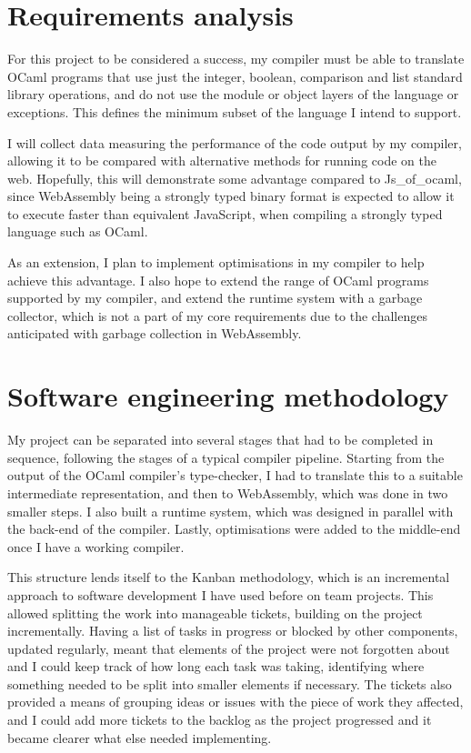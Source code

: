 \section{Requirements analysis}
For this project to be considered a success, my compiler must be able to translate OCaml programs that use just the integer, boolean, comparison and list standard library operations, and do not use the module or object layers of the language or exceptions. This defines the minimum subset of the language I intend to support. 

I will collect data measuring the performance of the code output by my compiler, allowing it to be compared with alternative methods for running code on the web.  Hopefully, this will demonstrate some advantage compared to Js\_of\_ocaml, since WebAssembly being a strongly typed binary format is expected to allow it to execute faster than equivalent JavaScript, when compiling a strongly typed language such as OCaml.

As an extension, I plan to implement optimisations in my compiler to help achieve this advantage. I also hope to extend the range of OCaml programs supported by my compiler, and extend the runtime system with a garbage collector, which is not a part of my core requirements due to the challenges anticipated with garbage collection in WebAssembly.



\section{Software engineering methodology}

My project can be separated into several stages that had to be completed in sequence, following the stages of a typical compiler pipeline. Starting from the output of the OCaml compiler's type-checker, I had to translate this to a suitable intermediate representation, and then to WebAssembly, which was done in two smaller steps. I also built a runtime system, which was designed in parallel with the back-end of the compiler. Lastly, optimisations were added to the middle-end once I have a working compiler. 

This structure lends itself to the Kanban methodology, which is an incremental approach to software development I have used before on team projects. This allowed splitting the work into manageable tickets, building on the project incrementally. Having a list of tasks in progress or blocked by other components, updated regularly, meant that elements of the project were not forgotten about and I could keep track of how long each task was taking, identifying where something needed to be split into smaller elements if necessary. The tickets also provided a means of grouping ideas or issues with the piece of work they affected, and I could add more tickets to the backlog as the project progressed and it became clearer what else needed implementing.

